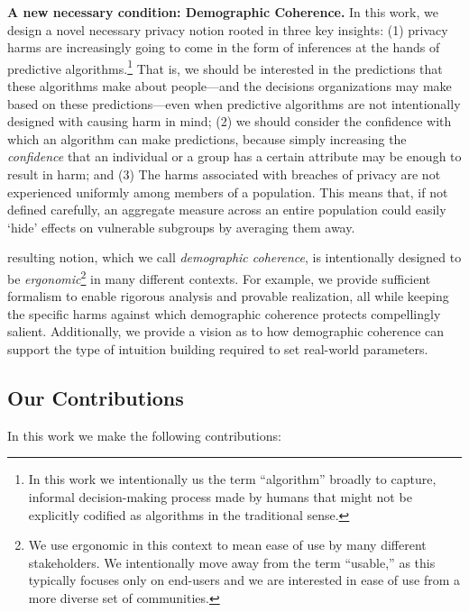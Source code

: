 \vspace{0.5em}
\noindent
\textbf{A new necessary condition: Demographic Coherence.} In this work, we design a novel necessary privacy notion rooted in three key insights: 
(1) privacy harms are increasingly going to come in the form of inferences at the hands of predictive algorithms.\footnote{In this work we intentionally us the term ``algorithm'' broadly to capture, \eg informal decision-making process made by humans that might not be explicitly codified as algorithms in the traditional sense.} That is, we should be interested in the predictions that these algorithms make about people---and the decisions organizations may make based on these predictions---even when predictive algorithms are not intentionally designed with causing harm in mind; (2) we should consider the confidence with which an algorithm can make predictions, because simply increasing the \emph{confidence} that an individual or a group has a certain attribute may be enough to result in harm;
and (3) The harms associated with breaches of privacy are not experienced uniformly among members of a population. This means that, if not defined carefully, an aggregate measure across an entire population could easily `hide' effects on vulnerable subgroups by averaging them away.

 resulting notion, which we call \emph{demographic coherence}, is intentionally designed to be \emph{ergonomic}\footnote{We use ergonomic in this context to mean ease of use by many different stakeholders.  We intentionally move away from the term ``usable,'' as this typically focuses only on end-users and we are interested in ease of use from a more diverse set of communities.} in many different contexts. For example, we provide sufficient formalism to enable rigorous analysis and provable realization, all while keeping the specific harms against which demographic coherence protects compellingly  salient.  Additionally, we provide a vision as to how demographic coherence can support the type of intuition building required to set real-world parameters. 

\subsection{Our Contributions}

In this work we make the following contributions:

